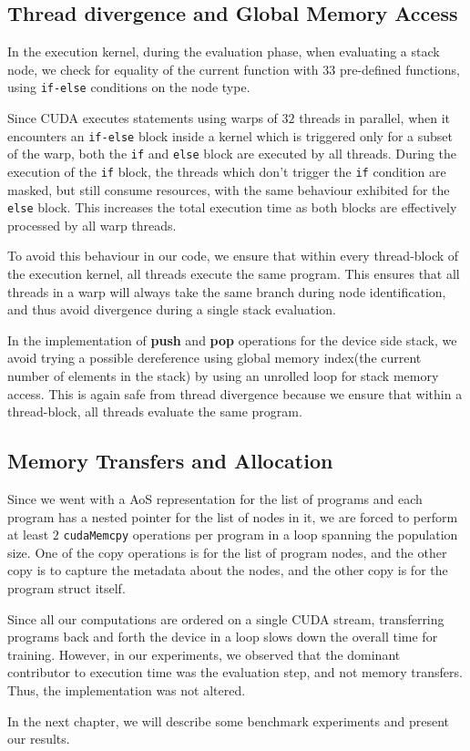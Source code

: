 \subsection{Thread divergence and Global Memory Access}
\label{prob:divergence}
In the execution kernel, during the evaluation phase, when evaluating a stack node, we check for equality of the current function with $33$ pre-defined functions, using \lstinline!if-else! conditions on the node type. 

Since CUDA executes statements using warps of $32$ threads in parallel, when it encounters an \lstinline!if-else! block inside a kernel which is triggered only for a subset of the warp, both the \lstinline!if! and \lstinline!else! block are executed by all threads. During the execution of the \lstinline!if! block, the threads which don't trigger the \lstinline!if! condition are masked, but still consume resources, with the same behaviour exhibited for the \lstinline!else! block. This increases the total execution time as both blocks are effectively processed by all warp threads. 

To avoid this behaviour in our code, we ensure that within every thread-block of the execution kernel, all threads execute the same program. This ensures that all threads in a warp will always take the same branch during node identification, and thus avoid divergence during a single stack evaluation.

In the implementation of \textbf{push} and \textbf{pop} operations for the device side stack, we avoid trying a possible dereference using global memory index(the current number of elements in the stack) by using an unrolled loop for stack memory access. This is again safe from thread divergence because we ensure that within a thread-block, all threads evaluate the same program. 

\subsection{Memory Transfers and Allocation}
\label{prob:memcpy}
Since we went with a AoS representation for the list of programs and each program has a nested pointer for the list of nodes in it, we are forced to perform at least $2$ \lstinline!cudaMemcpy! operations per program in a loop spanning the population size. One of the copy operations is for the list of program nodes, and the other copy is to capture the metadata about the nodes, and the other copy is for the program struct itself. 

Since all our computations are ordered on a single CUDA stream, transferring programs back and forth the device in a loop slows down the overall time for training. However, in our experiments, we observed that the dominant contributor to execution time was the evaluation step, and not memory transfers. Thus, the implementation was not altered.

In the next chapter, we will describe some benchmark experiments and present our results. 
